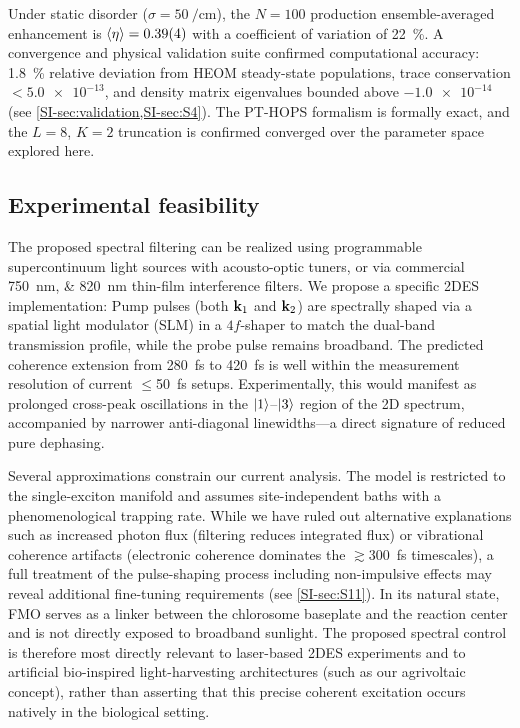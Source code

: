 \documentclass[journal=jpcl,manuscript=letter]{achemso}
\begin{document}
Under static disorder ($\sigma = \SI{50}{\per\centi\meter}$), the $N=100$ production ensemble-averaged enhancement is $\expval{\eta} = 0.39(4)$ with a coefficient of variation of \SI{22}{\percent}. A convergence and physical validation suite confirmed computational accuracy: \SI{1.8}{\percent} relative deviation from HEOM steady-state populations, trace conservation $< \num{5.0e-13}$, and density matrix eigenvalues bounded above $\num{-1.0e-14}$ (see \cref{SI-sec:validation,SI-sec:S4}). The PT-HOPS formalism is formally exact, and the $L=8$, $K=2$ truncation is confirmed converged over the parameter space explored here.

\subsection*{Experimental feasibility}

The proposed spectral filtering can be realized using programmable supercontinuum light sources with acousto-optic tuners,\cite{Gunthardt2023} or via commercial \SIlist{750;820}{\nano\meter} thin-film interference filters. We propose a specific 2DES implementation:\cite{Sebastian2024} Pump pulses (both $\vb{k}_1$ and $\vb{k}_2$) are spectrally shaped via a spatial light modulator (SLM) in a $4f$-shaper to match the dual-band transmission profile, while the probe pulse remains broadband.
The predicted coherence extension from \SI{280}{\femto\second} to \SI{420}{\femto\second} is well within the measurement resolution of current $\leq$\SI{50}{\femto\second} setups.\cite{Engel2007} Experimentally, this would manifest as prolonged cross-peak oscillations in the $\ket{1}$--$\ket{3}$ region of the 2D spectrum, accompanied by narrower anti-diagonal linewidths—a direct signature of reduced pure dephasing. 

Several approximations constrain our current analysis. The model is restricted to the single-exciton manifold and assumes site-independent baths with a phenomenological trapping rate. While we have ruled out alternative explanations such as increased photon flux (filtering reduces integrated flux) or vibrational coherence artifacts (electronic coherence dominates the $\gtrsim$\SI{300}{\femto\second} timescales), a full treatment of the pulse-shaping process including non-impulsive effects may reveal additional fine-tuning requirements (see \cref{SI-sec:S11}). In its natural state, FMO serves as a linker between the chlorosome baseplate and the reaction center and is not directly exposed to broadband sunlight.\cite{Blankenship2011} The proposed spectral control is therefore most directly relevant to laser-based 2DES experiments and to artificial bio-inspired light-harvesting architectures (such as our agrivoltaic concept), rather than asserting that this precise coherent excitation occurs natively in the biological setting.
\end{document}
